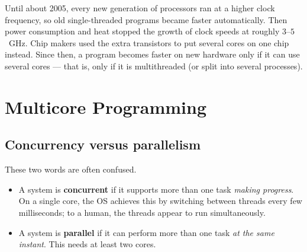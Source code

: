 \documentclass[11pt,a4paper]{article}
\newcommand{\term}[1]{\textbf{\color{mintdeep}#1}}
\begin{document}
\begin{histnote}
Until about 2005, every new generation of processors ran at a higher clock frequency, so old single-threaded programs became faster automatically. Then power consumption and heat stopped the growth of clock speeds at roughly $3$--$5$~GHz. Chip makers used the extra transistors to put several cores on one chip instead. Since then, a program becomes faster on new hardware only if it can use several cores --- that is, only if it is multithreaded (or split into several processes).
\end{histnote}

\section{Multicore Programming}

\subsection{Concurrency versus parallelism}

These two words are often confused.

\begin{itemize}
  \item A system is \term{concurrent} if it supports more than one task \emph{making progress}. On a single core, the OS achieves this by switching between threads every few milliseconds; to a human, the threads appear to run simultaneously.
  \item A system is \term{parallel} if it can perform more than one task \emph{at the same instant}. This needs at least two cores.
\end{itemize}
\end{document}

